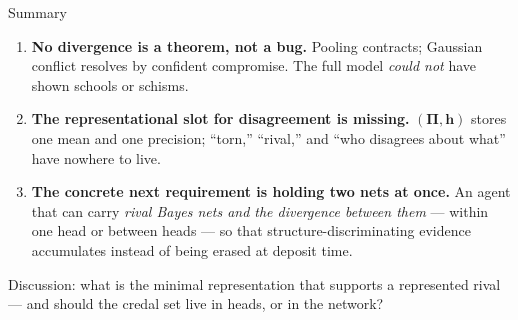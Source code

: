 \documentclass[aspectratio=169,11pt]{beamer}
\newcommand{\Pii}{\bm{\Pi}}
\newcommand{\hh}{\bm{h}}
\begin{document}
\begin{frame}{Summary}
  \begin{enumerate}
    \setlength{\itemsep}{0.8em}
    \item \textbf{No divergence is a theorem, not a bug.} Pooling contracts;
      Gaussian conflict resolves by confident compromise. The full model
      \emph{could not} have shown schools or schisms.
    \item \textbf{The representational slot for disagreement is missing.}
      $(\Pii,\hh)$ stores one mean and one precision; ``torn,'' ``rival,'' and
      ``who disagrees about what'' have nowhere to live.
    \item \textbf{The concrete next requirement is holding two nets at
      once.} An agent that can carry \emph{rival Bayes nets and the
      divergence between them} --- within one head or between heads ---
      so that structure-discriminating evidence accumulates instead of
      being erased at deposit time.
  \end{enumerate}
  \vspace{0.8em}
  \begin{center}
    \large Discussion: what is the minimal representation that supports a
    represented rival --- and should the credal set live in heads, or in the
    network?
  \end{center}
\end{frame}
\end{document}
